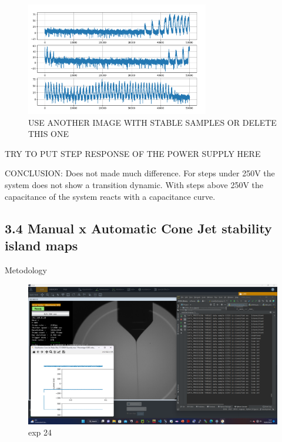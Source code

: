 \begin{multicols}{2}
        \begin{figure}[H]
            \center
            \includegraphics[width=8cm]{images/data_samples.png}
            \caption{ USE ANOTHER IMAGE WITH STABLE SAMPLES OR DELETE THIS ONE }
        \end{figure}

    \end{multicols}

    {TRY TO PUT STEP RESPONSE OF THE POWER SUPPLY HERE}


    CONCLUSION: Does not made much difference. For steps under 250V the system does not show a transition dynamic. 
    With steps above 250V the capacitance of the system reacts with a capacitance curve.



\subsection*{3.4 Manual x Automatic Cone Jet stability island maps}

    Metodology

    \begin{figure}[H]
        \center
        \includegraphics[width=14cm]{joao_26-01-22/screenshots/stableConeExp.png}
        \caption{exp 24}
    \end{figure}

